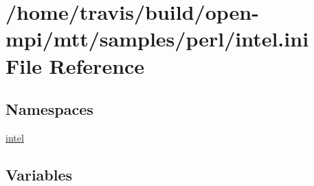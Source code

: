 \hypertarget{intel_8ini}{\section{/home/travis/build/open-\/mpi/mtt/samples/perl/intel.ini File Reference}
\label{intel_8ini}
}
\subsection*{Namespaces}
\begin{DoxyCompactItemize}
\item 
\hyperlink{namespaceintel}{intel}
\end{DoxyCompactItemize}
\subsection*{Variables}
